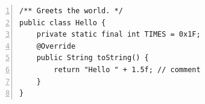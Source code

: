\documentclass{article}
\begin{document}
\begin{Verbatim}[numbers=left, fontsize=\footnotesize]
/** Greets the world. */
public class Hello {
    private static final int TIMES = 0x1F;
    @Override
    public String toString() {
        return "Hello " + 1.5f; // comment
    }
}
\end{Verbatim}
\end{document}
